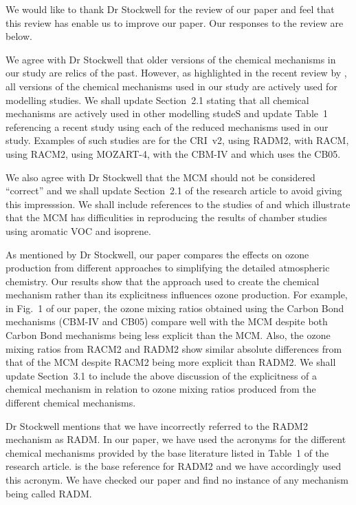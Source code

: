 \documentclass{article}
\begin{document}
We would like to thank Dr Stockwell for the review of our paper and feel that this review has enable us to improve our paper.
Our responses to the review are below.

We agree with Dr Stockwell that older versions of the chemical mechanisms in our study are relics of the past.
However, as highlighted in the recent review by \citet{Baklanov:2014}, all versions of the chemical mechanisms used in our study are actively used for modelling studies.
We shall update Section~2.1 stating that all chemical mechanisms are actively used in other modelling studeS and update Table~1 referencing a recent study using each of the reduced mechanisms used in our study.
Examples of such studies are \citet{Derwent:2015} for the CRI~v2, \citet{Li:2014} using RADM2, \citet{Ahmadov:2015} with RACM, \citet{Goliff:2015} using RACM2, \citet{Hou:2015} using MOZART-4, \citet{Foster:2014} with the CBM-IV and \citet{Dunker:2015} which uses the CB05.

We also agree with Dr Stockwell that the MCM should not be considered ``correct'' and we shall update Section~2.1 of the research article to avoid giving this impresssion.
We shall include references to the studies of \citet{Bloss:2005} and \citet{Pinho:2005} which illustrate that the MCM has difficulities in reproducing the results of chamber studies using aromatic VOC and isoprene.

As mentioned by Dr Stockwell, our paper compares the effects on ozone production from different approaches to simplifying the detailed atmospheric chemistry.
Our results show that the approach used to create the chemical mechanism rather than its explicitness influences ozone production.
For example, in Fig.~1 of our paper, the ozone mixing ratios obtained using the Carbon Bond mechanisms (CBM-IV and CB05) compare well with the MCM despite both Carbon Bond mechanisms being less explicit than the MCM.
Also, the ozone mixing ratios from RACM2 and RADM2 show similar absolute differences from that of the MCM despite RACM2 being more explicit than RADM2.
We shall update Section~3.1 to include the above discussion of the explicitness of a chemical mechanism in relation to ozone mixing ratios produced from the different chemical mechanisms.

Dr Stockwell mentions that we have incorrectly referred to the RADM2 mechanism as RADM.
In our paper, we have used the acronyms for the different chemical mechanisms provided by the base literature listed in Table~1 of the research article.
\citet{Stockwell:1990} is the base reference for RADM2 and we have accordingly used this acronym.
We have checked our paper and find no instance of any mechanism being called RADM.
\end{document}
